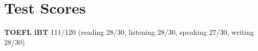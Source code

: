 
\section{Test Scores}
\begin{compactitem} 
	\item \textbf{TOEFL iBT} 111/120 (reading 28/30, listening 28/30, speaking 27/30, writing 28/30)
\end{compactitem}